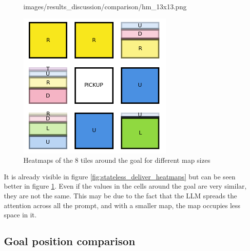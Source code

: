 \begin{figure}[h]
\begin{minipage}[b]{0.19\textwidth}
{      images/results_discussion/comparison/hm_13x13.png
    }
    \caption{13x13}
    \label{fig:hm_13x13}
  \end{minipage}
  \hfill
  \begin{minipage}[b]{0.19\textwidth}
    \centering
    \includegraphics[width=\textwidth]{
      images/results_discussion/comparison/hm_21x21.png
    }
    \caption{21x21}
    \label{fig:hm_21x21}
  \end{minipage}
  \caption{Heatmaps of the 8 tiles around the goal for different map sizes}
  \label{fig:around_comparison}
\end{figure}
\vspace{5mm}

It is already visible in figure \ref{fig:stateless_deliver_heatmaps} but can be seen
better in figure \ref{fig:around_comparison}. Even if the values in the cells
around the goal are very similar, they are not the same. This may be due to the
fact that the LLM spreads the attention across all the prompt, and with a smaller
map, the map occupies less space in it.

\subsection{Goal position comparison}

